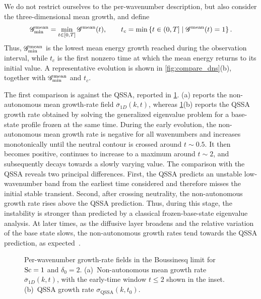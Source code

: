 We do not restrict ourselves to the per-wavenumber description, but also consider the
three-dimensional mean growth, and define
\begin{equation}
  \mathscr{G}^{\mathrm{mean}}_{\min}=\min_{t\in[0,T]}\mathscr{G}^{\mathrm{mean}}(t),
  \qquad
  t_c=\min\left\{t\in(0,T]\mid\mathscr{G}^{\mathrm{mean}}(t)=1\right\}.
  \label{eq:minimum_growth_critical_time_definitions}
\end{equation}
Thus, \(\mathscr{G}^{\mathrm{mean}}_{\min}\) is the lowest mean energy growth reached during the observation interval,
while \(t_c\) is the first nonzero time at which the mean energy returns to its initial value. A
representative evolution is shown in \cref{fig:compare_dns}(b), together with \(\mathscr{G}^{\mathrm{mean}}_{\min}\) and
\(t_c\).

The first comparison is against the QSSA, reported in \cref{fig:BQ_P3_sigma_map}.
(a) reports the non-autonomous mean growth-rate field
\(\overline{\sigma}_{1D}(k,t)\), whereas \cref{fig:BQ_P3_sigma_map}(b) reports the QSSA
growth rate obtained by solving the generalized eigenvalue problem for a base-state profile frozen
at the same time. During the early evolution, the non-autonomous mean growth rate is negative for
all wavenumbers and increases monotonically until the neutral contour is crossed around
\(t\sim0.5\). It then becomes positive, continues to increase to a maximum around \(t\sim2\),
and subsequently decays towards a slowly varying value. The comparison with the QSSA reveals two principal differences. First, the QSSA predicts an
unstable low-wavenumber band from the earliest time considered and therefore misses the initial
stable transient. Second, after crossing neutrality, the non-autonomous growth rate rises above the
QSSA prediction. Thus, during this stage, the instability is stronger than predicted by a classical
frozen-base-state eigenvalue analysis. At later times, as the diffusive layer broadens and the
relative variation of the base state slows, the non-autonomous growth rates tend towards the QSSA
prediction, as expected~\citep{tan-homsy-1986}.

\begin{figure}[t]
  \centering
  \begin{minipage}[t]{0.48\textwidth}
    \centering
    
  \end{minipage}
  \hfill
  \begin{minipage}[t]{0.48\textwidth}
    \centering
    
  \end{minipage}

  \medskip
  
  \caption{Per-wavenumber growth-rate fields in the Boussinesq limit for \(\mathrm{Sc}=1\) and
  \(\delta_0=2\). (a)~Non-autonomous mean growth rate \(\overline{\sigma}_{1D}(k,t)\), with the
  early-time window \(t\leq2\) shown in the inset. (b)~QSSA growth rate
  \(\sigma_{\mathrm{QSSA}}(k,t_0)\).}
  \label{fig:BQ_P3_sigma_map}
\end{figure}






